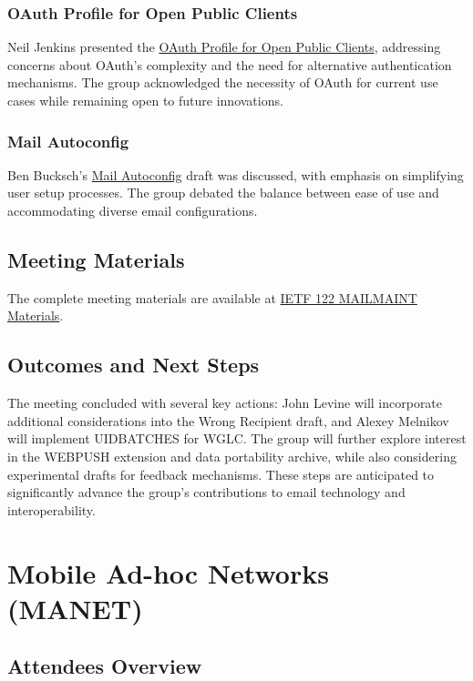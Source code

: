 \documentclass{article}
\begin{document}
\subsubsection{OAuth Profile for Open Public Clients}
Neil Jenkins presented the \href{https://datatracker.ietf.org/doc/html/draft-ietf-mailmaint-oauth-public}{OAuth Profile for Open Public Clients}, addressing concerns about OAuth's complexity and the need for alternative authentication mechanisms. The group acknowledged the necessity of OAuth for current use cases while remaining open to future innovations.

\subsubsection{Mail Autoconfig}
Ben Bucksch's \href{https://datatracker.ietf.org/doc/html/draft-ietf-mailmaint-autoconfig}{Mail Autoconfig} draft was discussed, with emphasis on simplifying user setup processes. The group debated the balance between ease of use and accommodating diverse email configurations.

\subsection{Meeting Materials}
The complete meeting materials are available at \href{https://www.ietf.org/proceedings/122/mailmaint.html}{IETF 122 MAILMAINT Materials}.

\subsection{Outcomes and Next Steps}
The meeting concluded with several key actions: John Levine will incorporate additional considerations into the Wrong Recipient draft, and Alexey Melnikov will implement UIDBATCHES for WGLC. The group will further explore interest in the WEBPUSH extension and data portability archive, while also considering experimental drafts for feedback mechanisms. These steps are anticipated to significantly advance the group's contributions to email technology and interoperability.



\newpage

\section{Mobile Ad-hoc Networks (MANET)}

\subsection{Attendees Overview}
\end{document}
